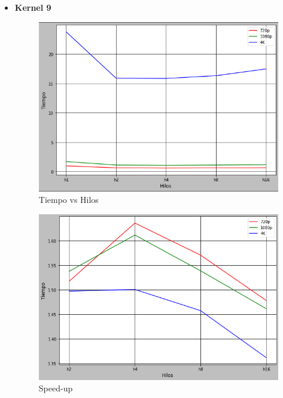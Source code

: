 \documentclass[a4paper,10pt]{IEEEtran}
\begin{document}
\begin{itemize}
    \item \textbf{Kernel 9} 
        \begin{figure}[H]
            \centering
            \includegraphics[scale = 0.3]{images/k9.png}
            \caption{Tiempo vs Hilos}
            \label{f03}
        \end{figure}{}
        
        \begin{figure}[H]
            \centering
            \includegraphics[scale = 0.3]{images/k9s.png}
            \caption{Speed-up}
            \label{f03a}
        \end{figure}{}
        

\end{itemize}
\end{document}
